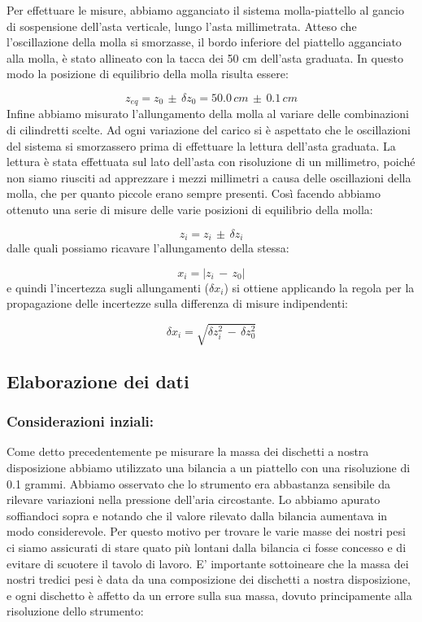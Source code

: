 Per effettuare le misure, abbiamo agganciato il sistema molla-piattello al gancio di sospensione dell'asta verticale, lungo l'asta millimetrata. Atteso che l'oscillazione della molla si smorzasse, il bordo inferiore del piattello agganciato alla molla, è stato allineato con la tacca dei 50 cm dell'asta graduata. In questo modo la posizione di equilibrio della molla risulta essere:

\begin{equation*}
	z_{eq} = z_0\,\pm\,\delta z_0 = 50.0\,cm\,\pm\,0.1\,cm
\end{equation*}
%
Infine abbiamo misurato l'allungamento della molla al variare delle combinazioni di cilindretti scelte. Ad ogni variazione del carico si è aspettato che le oscillazioni del sistema si smorzassero prima di effettuare la lettura dell'asta graduata. La lettura è stata effettuata sul lato dell'asta con risoluzione di un millimetro, poiché non siamo riusciti ad apprezzare i mezzi millimetri a causa delle oscillazioni della molla, che per quanto piccole erano sempre presenti. Così facendo abbiamo ottenuto una serie di misure delle varie posizioni di equilibrio della molla:

\begin{equation*}
	z_i = z_i\,\pm\,\delta z_i 
\end{equation*}
%
dalle quali possiamo ricavare l'allungamento della stessa:

\begin{equation*}
	x_i = |z_i\,-\,z_0|
\end{equation*}
%
e quindi l’incertezza sugli allungamenti ($\delta x_i$) si ottiene applicando la regola per la propagazione delle incertezze sulla differenza di misure indipendenti:

\begin{equation*}
	\delta x_i = \sqrt{\delta z_i^2\,-\,\delta z_0^2}
\end{equation*}

\subsection{Elaborazione dei dati}

\subsubsection{Considerazioni inziali:}
Come detto precedentemente pe misurare la massa dei dischetti a nostra disposizione abbiamo utilizzato una bilancia a un piattello con una risoluzione di 0.1 grammi. Abbiamo osservato che lo strumento era abbastanza sensibile da rilevare variazioni nella pressione dell'aria circostante. Lo abbiamo apurato soffiandoci sopra e notando che il valore rilevato dalla bilancia aumentava in modo considerevole. Per questo motivo per trovare le varie masse dei nostri pesi ci siamo assicurati di stare quato più lontani dalla bilancia ci fosse concesso e di evitare di scuotere il tavolo di lavoro.
E' importante sottoineare che la massa dei nostri tredici pesi è data da una composizione dei dischetti a nostra disposizione, e ogni dischetto è affetto da un errore sulla sua massa, dovuto principamente alla risoluzione dello strumento:

